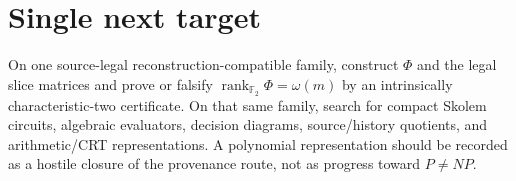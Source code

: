 \documentclass[11pt]{article}
\begin{document}
\section*{Single next target}
On one source-legal reconstruction-compatible family, construct \(\Phi\) and the legal slice matrices
and prove or falsify \(\operatorname{rank}_{\mathbb F_2}\Phi=\omega(m)\) by an intrinsically
characteristic-two certificate. On that same family, search for compact Skolem circuits, algebraic
evaluators, decision diagrams, source/history quotients, and arithmetic/CRT representations. A
polynomial representation should be recorded as a hostile closure of the provenance route, not as
progress toward \(P\neq NP\).

\end{document}
